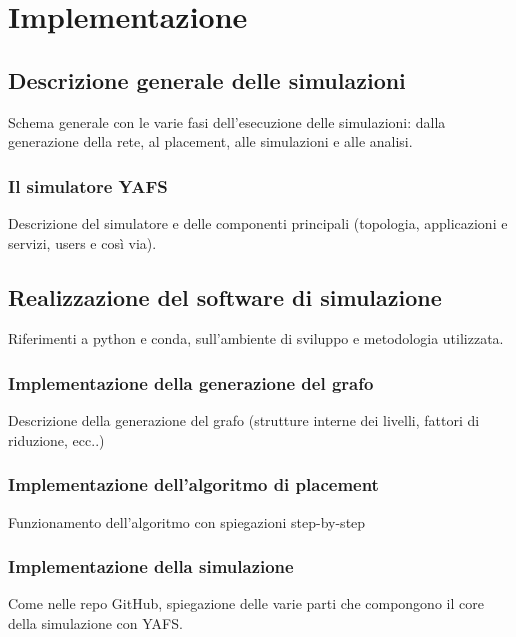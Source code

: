 \chapter{Implementazione}

\section{Descrizione generale delle simulazioni}

Schema generale con le varie fasi dell'esecuzione delle simulazioni: dalla generazione della rete, al placement, alle simulazioni e alle analisi.

\subsection{Il simulatore YAFS}

Descrizione del simulatore e delle componenti principali (topologia, applicazioni e servizi, users e così via).


\section{Realizzazione del software di simulazione}

Riferimenti a python e conda, sull'ambiente di sviluppo e metodologia utilizzata.

\subsection{Implementazione della generazione del grafo}

Descrizione della generazione del grafo (strutture interne dei livelli, fattori di riduzione, ecc..)

\subsection{Implementazione dell'algoritmo di placement}

Funzionamento dell'algoritmo con spiegazioni step-by-step

\subsection{Implementazione della simulazione}

Come nelle repo GitHub, spiegazione delle varie parti che compongono il core della simulazione con YAFS. 
